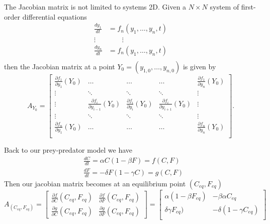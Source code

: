 \begin{remark}
The Jacobian matrix is not limited to systems 2D. Given a $N \times N$  system of first-order differential equations
\[
\begin{aligned}
 \displaystyle \frac{d y_1}{dt}  & = f_n(y_1, \dots, y_n, t)\\
\vdots & \qquad \vdots\\
 \displaystyle \frac{d y_n}{dt}  & = f_n(y_1, \dots, y_n, t)\\
\end{aligned}
\]
then the Jacobian matrix at a point $Y_0 = (y_{1,0}, \dots, y_{n,0})$ is given by
\[A_{Y_0} =  \begin{bmatrix}
\displaystyle\frac{\partial f_1}{\partial y_1}(Y_0)  & \dots & \dots & \dots  & \displaystyle\frac{\partial f_1}{\partial y_n}(Y_0)   \\
 \vdots & \ddots  & \ddots  & \ddots & \vdots  \\
 \vdots  &\displaystyle\frac{\partial f_i}{\partial y_{i-1}}(Y_0)  &\displaystyle\frac{\partial f_i}{\partial y_i}(Y_0)  & \displaystyle\frac{\partial f_i}{\partial y_{i+1}}(Y_0)   & \vdots\\
  \vdots  & \ddots  &\ddots & \ddots  & \vdots \\
\displaystyle\frac{\partial f_n}{\partial y_1}(Y_0)     & \dots & \dots  & \dots &  \displaystyle\frac{\partial f_n}{\partial y_n}(Y_0)  \\
\end{bmatrix} .
\]
\end{remark}


Back to our prey-predator model we have
\[
 \begin{aligned}
&\displaystyle \frac{dC}{dt} = \alpha C \left( 1 - \beta F\right)  = f(C,F)\\ 
&\displaystyle \frac{dF}{dt} = -  \delta F \left( 1 - \gamma C \right)  = g(C,F)
\end{aligned}
\]
Then our jacobian matrix becomes at an equilibrium point $(C_{eq}, F_{eq})$
\[ A_{(C_{eq}, F_{eq})} =   \begin{bmatrix}\displaystyle
\frac{\partial f}{\partial C}(C_{eq}, F_{eq})&  \displaystyle\frac{\partial f}{\partial F}(C_{eq}, F_{eq})\\
\displaystyle \frac{\partial g}{\partial C}(C_{eq}, F_{eq}) &  \displaystyle\frac{\partial g}{\partial F}(C_{eq}, F_{eq})
\end{bmatrix}   =  \begin{bmatrix}
\alpha (1 - \beta F_{eq})& - \beta \alpha C_{eq} \\
\delta \gamma F_{eq})&-\delta (1 - \gamma C_{eq})\\
\end{bmatrix}\]

